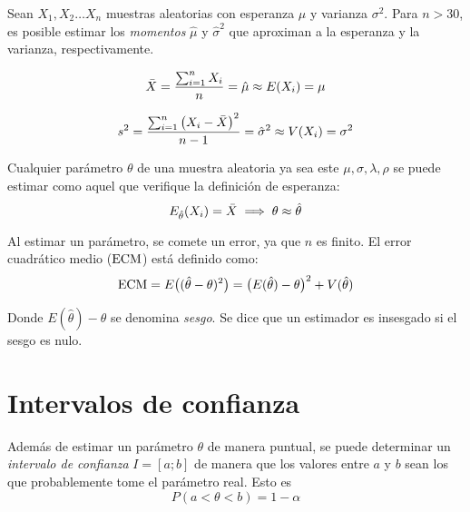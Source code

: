 Sean $X_1,X_2 \dots X_n$ muestras aleatorias con esperanza $\mu$ y varianza $\sigma^2$.
Para $n>30$, es posible estimar los \emph{momentos} $\hat{\mu}$ y $\hat{\sigma}^2$ que aproximan a la esperanza y la varianza, respectivamente.

\begin{mdframed}[style=DefinitionFrame]
    \begin{defn}
    \end{defn}
    \begin{equation*}
        \bar{X} = \frac{\sum_{i=1}^n X_i}{n} = \hat{\mu} \approx E(X_i) = \mu
    \end{equation*}
\end{mdframed}

\begin{mdframed}[style=DefinitionFrame]
    \begin{defn}
    \end{defn}
    \begin{equation*}
        s^2 = \frac{\sum_{i=1}^n \left(X_i - \bar{X}\right)^2}{n-1} = \hat{\sigma}^2 \approx V(X_i) = \sigma^2 
    \end{equation*}
\end{mdframed}

Cualquier parámetro $\theta$ de una muestra aleatoria ya sea este $\mu, \sigma, \lambda, \rho$ se puede estimar como aquel que verifique la definición de esperanza:
\begin{equation*}
    E_{\hat{\theta}} (X_i) = \bar{X} \implies \theta \approx \hat{\theta}
\end{equation*}

Al estimar un parámetro, se comete un error, ya que $n$ es finito.
El error cuadrático medio ($\operatorname{ECM}$) está definido como:
\begin{equation*}
    \operatorname{ECM} = E \big( (\hat{\theta} - \theta)^2 \big)
    = \big( E(\hat{\theta})-\theta \big)^2 + V(\hat{\theta})
\end{equation*}

Donde $E(\hat{\theta})-\theta$ se denomina \emph{sesgo}.
Se dice que un estimador es insesgado si el sesgo es nulo.


\section{Intervalos de confianza}

Además de estimar un parámetro $\theta$ de manera puntual, se puede determinar un \emph{intervalo de confianza} $I=[a;b]$ de manera que los valores entre $a$ y $b$ sean los que probablemente tome el parámetro real.
Esto es
\begin{equation*}
    P(a<\theta<b) = 1 - \alpha
\end{equation*}

